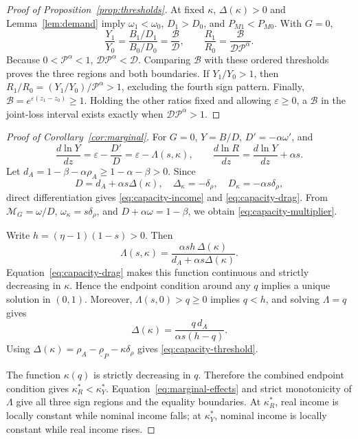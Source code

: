 \begin{proof}[Proof of Proposition~\ref{prop:thresholds}]
At fixed \(\kappa\), \(\Delta(\kappa)>0\) and
Lemma~\ref{lem:demand} imply
\(\omega_1<\omega_0\), \(D_1>D_0\), and \(P_{M1}<P_{M0}\). With \(G=0\),
\begin{equation}
 \frac{Y_1}{Y_0}=\frac{B_1/D_1}{B_0/D_0}
 =\frac{\mathcal B}{\mathcal D},\qquad
 \frac{R_1}{R_0}=
 \frac{\mathcal B}{\mathcal D\mathcal P^\alpha}.
 \label{eq:threshold-proof-ratios}
\end{equation}
Because \(0<\mathcal P^\alpha<1\),
\(\mathcal D\mathcal P^\alpha<\mathcal D\). Comparing
\(\mathcal B\) with these ordered thresholds proves the three regions and both
boundaries. If \(Y_1/Y_0>1\), then
\(R_1/R_0=(Y_1/Y_0)/\mathcal P^\alpha>1\), excluding the fourth sign pattern.
Finally, \(\mathcal B=e^{\varepsilon(z_1-z_0)}\geq1\). Holding the other
ratios fixed and allowing \(\varepsilon\geq0\), a \(\mathcal B\) in the
joint-loss interval exists exactly when
\(\mathcal D\mathcal P^\alpha>1\).
\end{proof}

\begin{proof}[Proof of Corollary~\ref{cor:marginal}]
For \(G=0\), \(Y=B/D\), \(D'=-\alpha\omega'\), and
\begin{equation}
 \frac{d\ln Y}{dz}=\varepsilon-\frac{D'}D
 =\varepsilon-\Lambda(s,\kappa),\qquad
 \frac{d\ln R}{dz}=\frac{d\ln Y}{dz}+\alpha s.
 \label{eq:marginal-proof}
\end{equation}
Let \(d_A=1-\beta-\alpha\rho_A\geq1-\alpha-\beta>0\). Since
\begin{equation}
 D=d_A+\alpha s\Delta(\kappa),\quad
 \Delta_\kappa=-\delta_\rho,\quad
 D_\kappa=-\alpha s\delta_\rho,
 \label{eq:capacity-denominator}
\end{equation}
direct differentiation gives \eqref{eq:capacity-income} and
\eqref{eq:capacity-drag}. From
\(\mathcal M_G=\omega/D\), \(\omega_\kappa=s\delta_\rho\), and
\(D+\alpha\omega=1-\beta\), we obtain
\eqref{eq:capacity-multiplier}.

Write \(h=(\eta-1)(1-s)>0\). Then
\begin{equation}
 \Lambda(s,\kappa)
 =\frac{\alpha s h\,\Delta(\kappa)}
 {d_A+\alpha s\Delta(\kappa)}.
 \label{eq:capacity-drag-rewrite}
\end{equation}
Equation~\eqref{eq:capacity-drag} makes this function continuous and strictly
decreasing in \(\kappa\). Hence the endpoint condition around any \(q\)
implies a unique solution in \((0,1)\). Moreover,
\(\Lambda(s,0)>q\geq0\) implies \(q<h\), and solving
\(\Lambda=q\) gives
\[
 \Delta(\kappa)=\frac{q\,d_A}{\alpha s(h-q)}.
\]
Using
\(\Delta(\kappa)=\rho_A-\underline\rho_P-\kappa\delta_\rho\)
gives \eqref{eq:capacity-threshold}.

The function \(\kappa(q)\) is strictly decreasing in \(q\). Therefore the
combined endpoint condition gives
\(\kappa_R^*<\kappa_Y^*\). Equation~\eqref{eq:marginal-effects} and strict
monotonicity of \(\Lambda\) give all three sign regions and the equality
boundaries. At \(\kappa_R^*\), real income is locally constant while nominal
income falls; at \(\kappa_Y^*\), nominal income is locally constant while real
income rises.
\end{proof}

